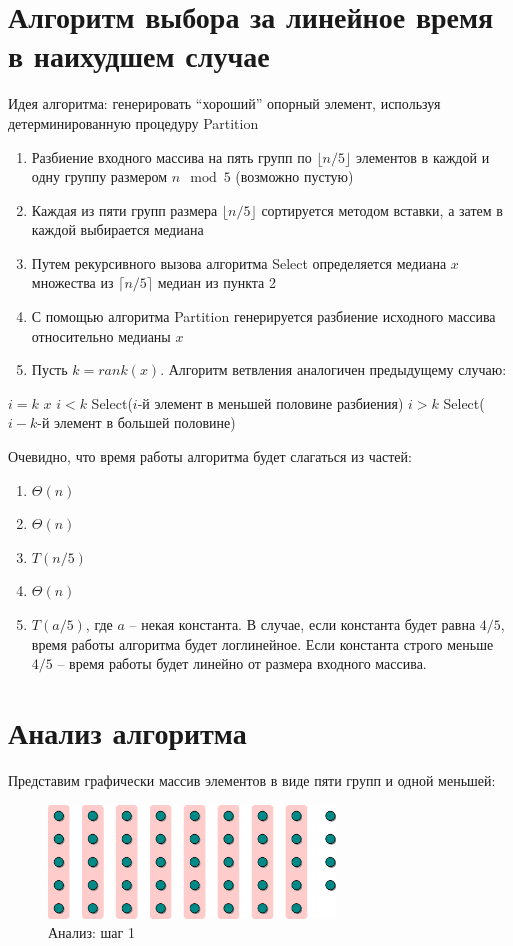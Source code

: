 \documentclass[11pt]{article}
\begin{document}
\section{Алгоритм выбора за линейное время в наихудшем случае}
Идея алгоритма: генерировать ``хороший'' опорный элемент, используя детерминированную процедуру Partition
\begin{enumerate}
\item Разбиение входного массива на пять групп по $\lfloor n/5 \rfloor$ элементов в каждой и одну группу размером $n \mod{5}$ (возможно пустую)
\item Каждая из пяти групп размера $\lfloor n/5 \rfloor$ сортируется методом вставки, а затем в каждой выбирается медиана
\item Путем рекурсивного вызова алгоритма Select определяется медиана $x$ множества из $\lceil n/5 \rceil$ медиан из пункта 2
\item С помощью алгоритма Partition генерируется разбиение исходного массива относительно медианы $x$
\item Пусть $k = rank(x)$. Алгоритм ветвления аналогичен предыдущему случаю:
\end{enumerate}
\begin{codebox}
\li \If $i = k$ 
\li \Then \Return $x$
\li \ElseIf $i < k$
\li \Then \Return Select($i$-й элемент в меньшей половине разбиения)
\li \ElseIf $i > k$
\li \Then \Return Select($i-k$-й элемент в большей половине)
\End
\end{codebox}

Очевидно, что время работы алгоритма будет слагаться из частей:
\begin{enumerate}
\item $\Theta(n)$
\item $\Theta(n)$
\item $T(n/5)$
\item $\Theta(n)$
\item $T(a/5)$, где $a$ -- некая константа. В случае, если константа будет равна $4/5$, время работы алгоритма будет логлинейное. Если константа строго меньше $4/5$ -- время работы будет линейно от размера входного массива.
\end{enumerate}

\section{Анализ алгоритма}
Представим графически массив элементов в виде пяти групп и одной меньшей:
\begin{figure}[ht]
  \centering
  \includegraphics[width=3in]{lecture6/analysis1.eps}
  \caption{Анализ: шаг 1}
  \label{fig:analysis1}
\end{figure}
\end{document}
